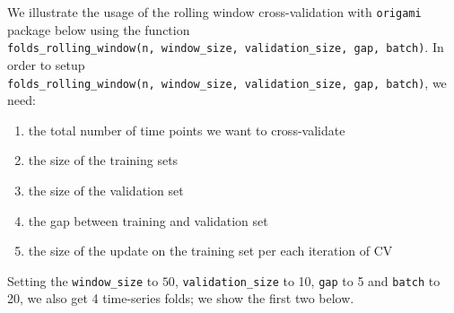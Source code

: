 \documentclass[12pt, krantz2,]{krantz}
\providecommand{\tightlist}{%
  \setlength{\itemsep}{0pt}\setlength{\parskip}{0pt}}
\theoremstyle{definition}
\theoremstyle{definition}
\theoremstyle{definition}
\newcommand{\1}{\mathbbm{1}}
\begin{document}
We illustrate the usage of the rolling window cross-validation with \texttt{origami}
package below using the function \texttt{folds\_rolling\_window(n,\ window\_size,\ validation\_size,\ gap,\ batch)}. In order to setup \texttt{folds\_rolling\_window(n,\ window\_size,\ validation\_size,\ gap,\ batch)}, we need:

\begin{enumerate}
\def\labelenumi{\arabic{enumi}.}
\tightlist
\item
  the total number of time points we want to cross-validate
\item
  the size of the training sets
\item
  the size of the validation set
\item
  the gap between training and validation set
\item
  the size of the update on the training set per each iteration of CV
\end{enumerate}

Setting the \texttt{window\_size} to \(50\), \texttt{validation\_size} to 10, \texttt{gap} to 5 and
\texttt{batch} to 20, we also get 4 time-series folds; we show the first two below.
\end{document}

